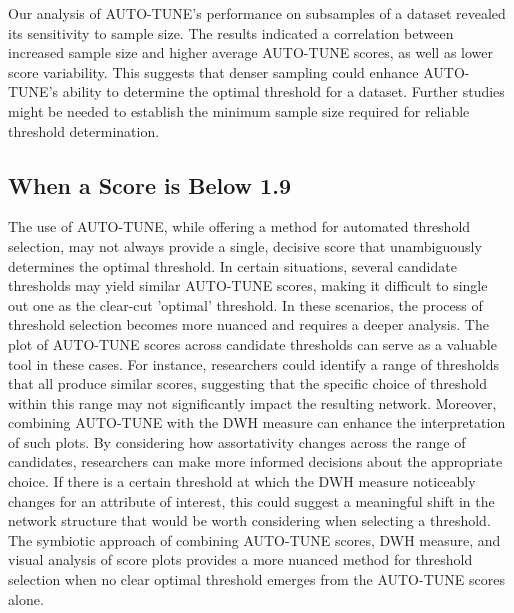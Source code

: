 \documentclass[utf8]{FrontiersinHarvard} %
\newcommand{\TODO}[1]{{\color{red}{#1}}}
\begin{document}
Our analysis of AUTO-TUNE's performance on subsamples of a dataset revealed its
sensitivity to sample size. The results indicated a correlation between
increased sample size and higher average AUTO-TUNE scores, as well as lower
score variability. This suggests that denser sampling could enhance AUTO-TUNE's
ability to determine the optimal threshold for a dataset. Further studies might
be needed to establish the minimum sample size required for reliable threshold
determination.

\subsection{When a Score is Below 1.9}

\TODO{add some text to explain that multiple scores at different thresholds could be indicative of inherently different scales in the network, e.g. global AND local combined into one}

The use of AUTO-TUNE, while offering a method for automated threshold
selection, may not always provide a single, decisive score that unambiguously
determines the optimal threshold. In certain situations, several candidate
thresholds may yield similar AUTO-TUNE scores, making it difficult to single
out one as the clear-cut 'optimal' threshold. In these scenarios, the process
of threshold selection becomes more nuanced and requires a deeper analysis. The
plot of AUTO-TUNE scores across candidate thresholds can serve as a valuable
tool in these cases. For instance, researchers could identify a range of
thresholds that all produce similar scores, suggesting that the specific choice
of threshold within this range may not significantly impact the resulting
network. Moreover, combining AUTO-TUNE with the DWH measure can enhance the
interpretation of such plots. By considering how assortativity changes across
the range of candidates, researchers can make more informed decisions about the
appropriate choice. If there is a certain threshold at which the DWH measure
noticeably changes for an attribute of interest, this could suggest a
meaningful shift in the network structure that would be worth considering when
selecting a threshold. The symbiotic approach of combining AUTO-TUNE scores,
DWH measure, and visual analysis of score plots provides a more nuanced method
for threshold selection when no clear optimal threshold emerges from the
AUTO-TUNE scores alone.
\end{document}
